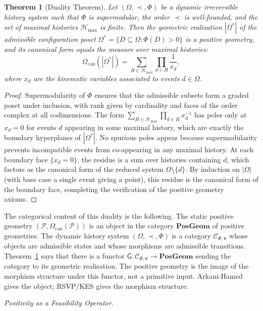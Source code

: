 \documentclass[11pt]{article}
\theoremstyle{plain}
\newtheorem{theorem}{Theorem}[section]
\theoremstyle{definition}
\theoremstyle{remark}
\newcommand{\Phif}{\Phi}
\newcommand{\OmKS}{\Omega}
\newcommand{\CF}{\Omega_{\mathrm{can}}}
\newcommand{\PG}{\mathbf{PosGeom}}
\newcommand{\Ccat}{\mathcal{C}_{\Phi,\mathbf{v}}}
\newcommand{\Gfun}{\mathsf{G}}
\newcommand{\Hmax}{\mathcal{H}_{\max}}
\begin{document}
\begin{theorem}[Duality Theorem]
\label{thm:duality}
Let $(\OmKS, \prec, \Phif)$ be a dynamic irreversible history system such that $\Phif$ is supermodular, the order $\prec$ is well-founded, and the set of maximal histories $\Hmax$ is finite. Then the geometric realization $|\OmKS^*|$ of the admissible configuration poset $\OmKS^* = \{D \subseteq \OmKS : \Phif(D) > 0\}$ is a positive geometry, and its canonical form equals the measure over maximal histories:
\[
  \CF(|\OmKS^*|) = \sum_{H \in \Hmax} \prod_{d \in H} \frac{1}{x_d},
\]
where $x_d$ are the kinematic variables associated to events $d \in \OmKS$.
\end{theorem}

\begin{proof}
Supermodularity of $\Phif$ ensures that the admissible subsets form a graded poset under inclusion, with rank given by cardinality and faces of the order complex at all codimensions. The form $\sum_{H \in \Hmax} \prod_{d \in H} x_d^{-1}$ has poles only at $x_d = 0$ for events $d$ appearing in some maximal history, which are exactly the boundary hyperplanes of $|\OmKS^*|$. No spurious poles appear because supermodularity prevents incompatible events from co-appearing in any maximal history. At each boundary face $\{x_d = 0\}$, the residue is a sum over histories containing $d$, which factors as the canonical form of the reduced system $\OmKS \setminus \{d\}$. By induction on $|\OmKS|$ (with base case a single event giving a point), this residue is the canonical form of the boundary face, completing the verification of the positive geometry axioms.
\end{proof}

The categorical content of this duality is the following. The static positive geometry $(\mathcal{P}, \CF(\mathcal{P}))$ is an object in the category $\PG$ of positive geometries. The dynamic history system $(\OmKS, \prec, \Phif)$ is a category $\Ccat$ whose objects are admissible states and whose morphisms are admissible transitions. Theorem~\ref{thm:duality} says that there is a functor $\Gfun: \Ccat \to \PG$ sending the category to its geometric realisation. The positive geometry is the image of the morphism structure under this functor, not a primitive input. Arkani-Hamed gives the object; RSVP/KES gives the morphism structure.

\medskip\noindent\textit{Positivity as a Feasibility Operator.}
\end{document}
